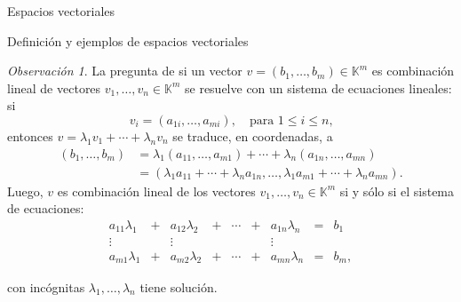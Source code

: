 \documentclass[a4paper,12pt,twoside,spanish,reqno]{amsbook}
\theoremstyle{definition}
\theoremstyle{remark}
\newtheorem{observacion}{Observaci\'on}[section]
\newcommand{\K}{\mathbb K}
\begin{document}
\begin{chapter}{Espacios vectoriales}
\begin{section}{Definición y ejemplos de espacios vectoriales}
		\begin{observacion}
			La pregunta de si un vector $v =(b_1,\ldots,b_m) \in \K^m$ es combinación lineal de vectores $v_1,\ldots,v_n \in \K^m$ se resuelve con un sistema de ecuaciones lineales: si 
			$$
			v_i = (a_{1i},\ldots,a_{mi}), \quad \text{para $1 \le i \le n$,}
			$$
			entonces $v = \lambda_1v_1 + \cdots +\lambda_nv_n$ se traduce, en coordenadas, a
			\begin{align*}
				(b_1,\ldots,b_m) &= \lambda_1(a_{11},\ldots,a_{m1}) + \cdots +\lambda_n(a_{1n},\ldots,a_{mn}) \\
				&= (\lambda_1a_{11} + \cdots+ \lambda_na_{1n}, \ldots, \lambda_1a_{m1} + \cdots+ \lambda_na_{mn}).
			\end{align*}
			Luego, $v$  es combinación lineal de los vectores $v_1,\ldots,v_n \in \K^m$ si y sólo si  el sistema de ecuaciones:
			\begin{equation*}
			\begin{matrix}
			a_{11}\lambda_1& + &a_{12}\lambda_2& + &\cdots& + &a_{1n}\lambda_n &= &b_1\\
			\vdots&  &\vdots& &&  &\vdots \\
			a_{m1}\lambda_1& + &a_{m2}\lambda_2& + &\cdots& + &a_{mn}\lambda_n &=&b_m,
			\end{matrix}
			\end{equation*}
	
			\noindent con incógnitas $\lambda_1,\ldots, \lambda_n$ tiene solución.
		\end{observacion}
		

\end{section}
\end{chapter}
\end{document}
